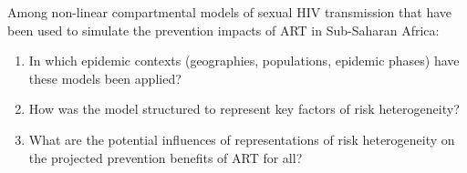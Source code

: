 Among non-linear compartmental models of sexual HIV transmission
that have been used to simulate the prevention impacts of ART in Sub-Saharan Africa:
\begin{enumerate}
\item\label{rq:1}
      In which epidemic contexts (geographies, populations, epidemic phases)
      have these models been applied?
\item\label{rq:2}
      How was the model structured to represent key factors of risk heterogeneity?
\item\label{rq:3}
      What are the potential influences of representations of risk heterogeneity
      on the projected prevention benefits of ART for all?
\end{enumerate}